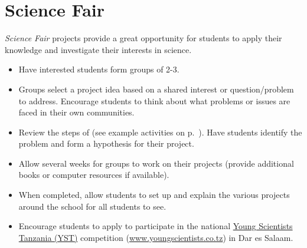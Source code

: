 %

\section{Science Fair} 
\emph{Science Fair} projects provide a great opportunity for students to apply their knowledge and investigate their interests in science.

\begin{itemize}
\item Have interested students form groups of 2-3.
\item Groups select a project idea based on a shared interest or question/problem to address. Encourage students to think about what problems or issues are faced in their own communities. 
\item Review the steps of  (see example activities on p.~\pageref{cha:scientific-procedure}). Have students identify the problem and form a hypothesis for their project.
\item Allow several weeks for groups to work on their projects (provide additional books or computer resources if available).
\item When completed, allow students to set up and explain the various projects around the school for all students to see.
\item Encourage students to apply to participate in the national \href{www.youngscientists.co.tz}{Young Scientists Tanzania (YST)} competition (\url{www.youngscientists.co.tz}) in Dar es Salaam.
\end{itemize}

